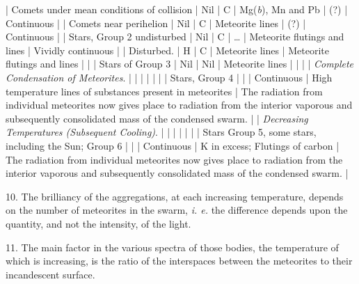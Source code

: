\documentclass[a4paper, 12pt, oneside, polutonikogreek, english]{article}
\begin{document}
| Comets under mean conditions of collision        | Nil           | C                | Mg(\emph{b}), Mn and Pb        | (?)                            | Continuous                                                                         |
| Comets near perihelion                 | Nil           | C                | Meteorite lines         | (?)                            | Continuous                                                                         |
| Stars, Group 2 undisturbed               | Nil           | C                | …                | Meteorite flutings and lines                | Vividly continuous                                                                     |
| Disturbed.                       | H            | C                | Meteorite lines         | Meteorite flutings and lines                |                                                                               |
| Stars of Group 3                    | Nil           | Nil               | Meteorite lines         |                              |                                                                               |
| \emph{Complete Condensation of Meteorites}.         |             |                 |                 |                              |                                                                               |
| Stars, Group 4                     |             |                 | Continuous            | High temperature lines of substances present in meteorites | The radiation from individual meteorites now gives place to radiation from the interior vaporous and subsequently consolidated mass of the condensed swarm. |
| \emph{Decreasing Temperatures (Subsequent Cooling)}.     |             |                 |                 |                              |                                                                               |
| Stars {Group 5, some stars, including the Sun; Group 6} |             |                 | Continuous            | K in excess; Flutings of carbon              | The radiation from individual meteorites now gives place to radiation from the interior vaporous and subsequently consolidated mass of the condensed swarm. |

10. The brilliancy of the aggregations, at each increasing temperature, depends on the number of meteorites in the swarm, \emph{i. e.} the difference depends upon the quantity, and not the intensity, of the light.

11. The main factor in the various spectra of those bodies, the temperature of which is increasing, is the ratio of the interspaces between the meteorites to their incandescent surface.
\end{document}
